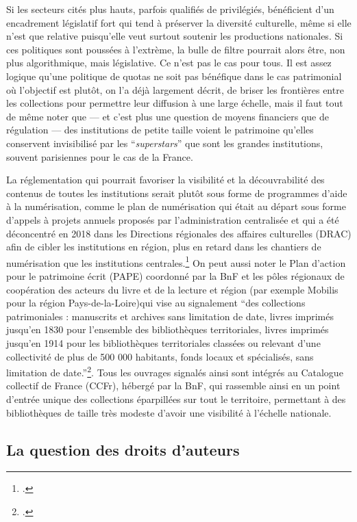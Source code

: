 Si les secteurs cités plus hauts, parfois qualifiés de privilégiés, bénéficient d’un encadrement législatif fort qui tend à préserver la diversité culturelle, même si elle n’est que relative puisqu’elle veut surtout soutenir les productions nationales. Si ces politiques sont poussées à l'extrème, la bulle de filtre pourrait alors être, non plus algorithmique, mais législative. Ce n’est pas le cas pour tous. Il est assez logique qu'une politique de quotas ne soit pas bénéfique dans le cas patrimonial où l’objectif est plutôt, on l’a déjà largement décrit, de briser les frontières entre les collections pour permettre leur diffusion à une large échelle, mais il faut tout de même noter que — et c’est plus une question de moyens financiers que de régulation — des institutions de petite taille voient le patrimoine qu’elles conservent invisibilisé par les \enquote{\textit{superstars}} que sont les grandes institutions, souvent parisiennes pour le cas de la France. 

La réglementation qui pourrait favoriser la visibilité et la découvrabilité des contenus de toutes les institutions serait plutôt sous forme de programmes d'aide à la numérisation, comme le plan de numérisation qui était au départ sous forme d'appels à projets annuels proposés par l'administration centralisée et qui a été déconcentré en 2018 dans les Directions régionales des affaires culturelles (DRAC) afin de cibler les institutions en région, plus en retard dans les chantiers de numérisation que les institutions centrales.\footcite{zotero-686} On peut aussi noter le Plan d'action pour le patrimoine écrit (PAPE) coordonné par la BnF et les pôles régionaux de coopération des acteurs du livre et de la lecture et région (par exemple Mobilis pour la région Pays-de-la-Loire)qui vise au signalement \enquote{des collections patrimoniales : manuscrits et archives sans limitation de date, livres imprimés jusqu’en 1830 pour l’ensemble des bibliothèques territoriales, livres imprimés jusqu’en 1914 pour les bibliothèques territoriales classées ou relevant d’une collectivité de plus de 500 000 habitants, fonds locaux et spécialisés, sans limitation de date.}\footcite{zotero-688}. Tous les ouvrages signalés ainsi sont intégrés au Catalogue collectif de France (CCFr), hébergé par la BnF, qui rassemble ainsi en un point d'entrée unique des collections éparpillées sur tout le territoire, permettant à des bibliothèques de taille très modeste d'avoir une visibilité à l'échelle nationale. 

\subsection{La question des droits d'auteurs}

